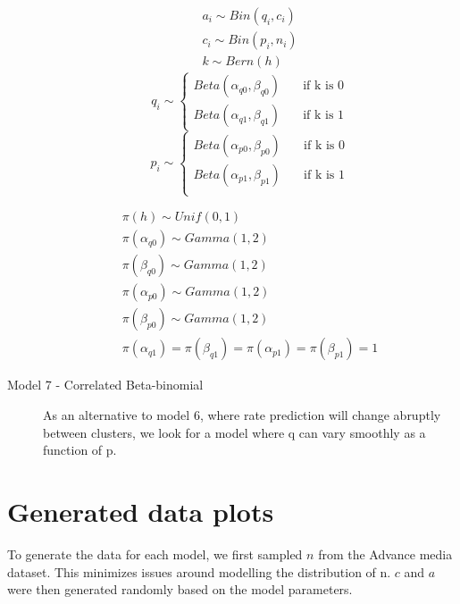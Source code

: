 \documentclass[11pt,a4,singlespacing,titlepagenumber=on]{scrreprt}
\numberwithin{equation}{chapter} %
\theoremstyle{remark}
\begin{document}
\begin{description}
 \begin{align}
	a_i \sim Bin(q_i,c_i) \\
	c_i \sim Bin(p_i,n_i) \\
	k \sim Bern(h) 
\end{align}
	\[ 
	q_i \sim 
  	\begin{cases}
		Beta(\alpha_{q0},\beta_{q0}) & \quad \text{if k is 0}\\
		Beta(\alpha_{q1},\beta_{q1}) & \quad \text{if k is 1}
	\end{cases}
	\]
	\[
	p_i \sim 
  	\begin{cases}
		Beta(\alpha_{p0},\beta_{p0}) & \quad \text{if k is 0}\\
		Beta(\alpha_{p1},\beta_{p1}) & \quad \text{if k is 1}\\
	\end{cases}
	\]

 \begin{align}
	\pi(h) \sim Unif(0,1) \\
	\pi(\alpha_{q0}) \sim Gamma(1,2) \\
	\pi(\beta_{q0}) \sim Gamma(1,2) \\
	\pi(\alpha_{p0}) \sim Gamma(1,2) \\
	\pi(\beta_{p0}) \sim Gamma(1,2) \\
	\pi(\alpha_{q1}) = \pi(\beta_{q1}) = \pi(\alpha_{p1}) = \pi(\beta_{p1}) = 1
\end{align}


	\item[Model 7 - Correlated Beta-binomial]

As an alternative to model 6, where rate prediction will change abruptly between clusters, we look for a model where q can vary smoothly as a function of p.

\end{description}


\section{Generated data plots}

To generate the data for each model, we first sampled $n$ from the Advance media dataset. This minimizes issues around modelling the distribution of n. $c$ and $a$ were then generated randomly based on the model parameters.
\end{document}
